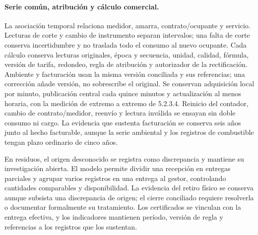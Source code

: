 \paragraph{Serie común, atribución y cálculo comercial.}
La asociación temporal relaciona medidor, amarra, contrato/ocupante y servicio. Lecturas de corte y cambio de instrumento separan intervalos; una falta de corte conserva incertidumbre y no traslada todo el consumo al nuevo ocupante. Cada cálculo conserva lecturas originales, época y secuencia, unidad, calidad, fórmula, versión de tarifa, redondeo, regla de atribución y autorizador de la rectificación. Ambiente y facturación usan la misma versión conciliada y sus referencias; una corrección añade versión, no sobrescribe el original.
Se conservan adquisición local por minuto, publicación central cada quince minutos y actualización al menos horaria, con la medición de extremo a extremo de 5.2.3.4. Reinicio del contador, cambio de contrato/medidor, reenvío y lectura inválida se ensayan sin doble consumo ni cargo. La evidencia que sustenta facturación se conserva seis años junto al hecho facturable, aunque la serie ambiental y los registros de combustible tengan plazo ordinario de cinco años.

En residuos, el origen desconocido se registra como discrepancia y mantiene su investigación abierta. El modelo permite dividir una recepción en entregas parciales y agrupar varios registros en una entrega al gestor, controlando cantidades comparables y disponibilidad. La evidencia del retiro físico se conserva aunque subsista una discrepancia de origen; el cierre conciliado requiere resolverla o documentar formalmente su tratamiento. Los certificados se vinculan con la entrega efectiva, y los indicadores mantienen período, versión de regla y referencias a los registros que los sustentan.

